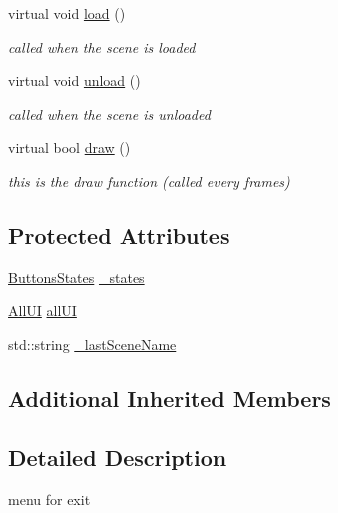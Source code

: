 \begin{DoxyCompactItemize}
\mbox{\label{class_scene_exit_af57945630bc2f2e45cb02db9b4db8140}} 
virtual void \hyperlink{class_scene_exit_af57945630bc2f2e45cb02db9b4db8140}{load} ()
\begin{DoxyCompactList}\small\item\em called when the scene is loaded \end{DoxyCompactList}\item 
\mbox{\label{class_scene_exit_a89d28a5876087e291453421545a3c5dc}} 
virtual void \hyperlink{class_scene_exit_a89d28a5876087e291453421545a3c5dc}{unload} ()
\begin{DoxyCompactList}\small\item\em called when the scene is unloaded \end{DoxyCompactList}\item 
virtual bool \hyperlink{class_scene_exit_a3b7110e736f86836568fdb2f8a997877}{draw} ()
\begin{DoxyCompactList}\small\item\em this is the draw function (called every frames) \end{DoxyCompactList}\end{DoxyCompactItemize}
\subsection*{Protected Attributes}
\begin{DoxyCompactItemize}
\item 
\hyperlink{struct_scene_exit_1_1_buttons_states}{Buttons\+States} \hyperlink{class_scene_exit_a46626e6689a0ab8eb87a8040e77e7849}{\+\_\+states}
\item 
\hyperlink{struct_scene_exit_1_1_all_u_i}{All\+UI} \hyperlink{class_scene_exit_ac20369aa55f37dff9d8016f3245802e2}{all\+UI}
\item 
std\+::string \hyperlink{class_scene_exit_ab79e5e47529f081f0ebe4298b5be4c97}{\+\_\+last\+Scene\+Name}
\end{DoxyCompactItemize}
\subsection*{Additional Inherited Members}


\subsection{Detailed Description}
menu for exit 

